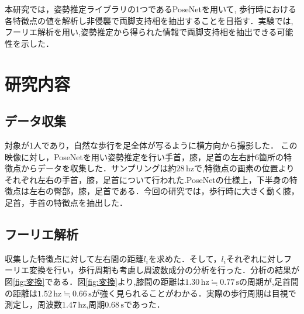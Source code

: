 \documentclass[a4j]{cis-resume}
\begin{document}
本研究では，姿勢推定ライブラリの1つであるPoseNetを用いて,
歩行時における各特徴点の値を解析し非侵襲で両脚支持相を抽出することを目指す．実験では,フーリエ解析を用い,姿勢推定から得られた情報で両脚支持相を抽出できる可能性を示した．
\section{研究内容} \label{sec:details}
\subsection{データ収集}
対象が1人であり，自然な歩行を足全体が写るように横方向から撮影した．
この映像に対し，PoseNetを用い姿勢推定を行い手首，膝，足首の左右計6箇所の特徴点からデータを収集した．サンプリングは約$28\,\mathrm{hz}$で,特徴点の画素の位置よりそれぞれ左右の手首，膝，足首について行われた.PoseNetの仕様上，下半身の特徴点は左右の臀部，膝，足首である．今回の研究では，歩行時に大きく動く膝，足首，手首の特徴点を抽出した．
\subsection{フーリエ解析}
収集した特徴点に対して左右間の距離$l_i$を求めた．そして，$l_i$それぞれに対しフーリエ変換を行い，歩行周期も考慮し周波数成分の分析を行った．分析の結果が図\ref{fig:変換}である．図\ref{fig:変換}より,膝間の距離は$1.30\,\mathrm{hz} \fallingdotseq 0.77\,\mathrm{s}$の周期が,足首間の距離は$1.52\,\mathrm{hz} \fallingdotseq 0.66\,\mathrm{s}$が強く見られることがわかる．実際の歩行周期は目視で測定し，周波数$1.47\,\mathrm{hz}$,周期$0.68\,\mathrm{s}$であった．
\end{document}
